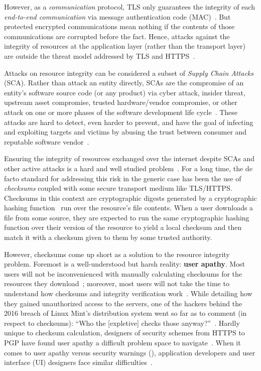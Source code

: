 However, as a \textit{communication} protocol, TLS only guarantees the integrity
of each \textit{end-to-end communication} via message authentication code
(MAC)~\cite{TLS1.2}. But protected encrypted communications mean nothing if the
contents of those communications are corrupted before the fact. Hence, attacks
against the integrity of resources at the application layer (rather than the
transport layer) are outside the threat model addressed by TLS and
HTTPS~\cite{TLS1.2, HTTPS}.

Attacks on resource integrity can be considered a subset of \emph{Supply Chain
Attacks} (SCA). Rather than attack an entity directly, SCAs are the compromise
of an entity's software source code (or any product) via cyber attack, insider
threat, upstream asset compromise, trusted hardware/vendor compromise, or other
attack on one or more phases of the software development life
cycle~\cite{NIST-SCA}. These attacks are hard to detect, even harder to prevent,
and have the goal of infecting and exploiting targets and victims by abusing the
trust between consumer and reputable software vendor~\cite{SCA}.

Ensuring the integrity of resources exchanged over the internet despite SCAs and
other active attacks is a hard and well studied problem~\cite{MD5Header,
HTTP1.1, HTTPS, SRI, LF, OpenPGP1, DNSSEC, PKI, Cherubini, Stickler}. For a long
time, the de facto standard for addressing this risk in the generic case has
been the use of \textit{checksums} coupled with some secure transport medium
like TLS/HTTPS. Checksums in this context are cryptographic digests generated by
a cryptographic hashing function~\cite{Rogaway} run over the resource's file
contents. When a user downloads a file from some source, they are expected to
run the same cryptographic hashing function over their version of the resource
to yield a local checksum and then match it with a checksum given to them by
some trusted authority.

However, checksums come up short as a solution to the resource integrity
problem. Foremost is a well-understood but harsh reality: \textbf{user apathy}.
Most users will not be inconvenienced with manually calculating checksums for
the resources they download~\cite{Cherubini, Fagan}; moreover, most users will
not take the time to understand how checksums and integrity verification
work~\cite{Cherubini, Tan, Hsiao}. While detailing how they gained unauthorized
access to the servers, one of the hackers behind the 2016 breach of Linux Mint's
distribution system went so far as to comment (in respect to checksums): ``Who
the [expletive] checks those anyway?''~\cite{SCA-MINT3}. Hardly unique to
checksum calculation, designers of security schemes from HTTPS to PGP have found
user apathy a difficult problem space to navigate~\cite{PGPBad, Cherubini}. When
it comes to user apathy versus security warnings (),
application developers and user interface (UI) designers face similar
difficulties~\cite{Egelman1, Egelman2, Modic, Reeder, Silic, Sunshine, Bianchi,
Akhawe}.

